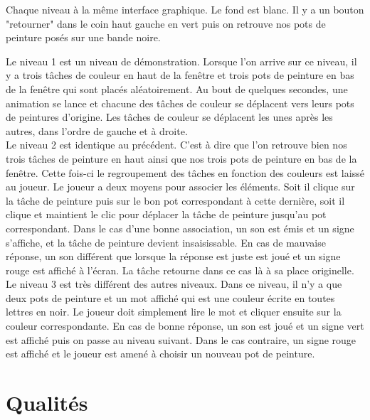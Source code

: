 \documentclass{article}
\begin{document}
Chaque niveau à la même interface graphique. Le fond est blanc. Il y a un bouton "retourner" dans le coin haut gauche en vert puis on retrouve nos pots de peinture posés sur une bande noire.

Le niveau 1 est un niveau de démonstration. Lorsque l'on arrive sur ce niveau, il y a trois tâches de couleur en haut de la fenêtre et trois pots de peinture en bas de la fenêtre qui sont placés aléatoirement. Au bout de quelques secondes, une animation se lance et chacune des tâches de couleur se déplacent vers leurs pots de peintures d'origine. Les tâches de couleur se déplacent les unes après les autres, dans l'ordre de gauche et à droite.\\

Le niveau 2 est identique au précédent. C'est à dire que l'on retrouve bien nos trois tâches de peinture en haut ainsi que nos trois pots de peinture en bas de la fenêtre. Cette fois-ci le regroupement des tâches en fonction des couleurs est laissé au joueur. Le joueur a deux moyens pour associer les éléments. Soit il clique sur la tâche de peinture puis sur le bon pot correspondant à cette dernière, soit il clique et maintient le clic pour déplacer la tâche de peinture jusqu'au pot correspondant. Dans le cas d'une bonne association, un son est émis et un signe s'affiche, et la tâche de peinture devient insaisissable. En cas de mauvaise réponse, un son différent que lorsque la réponse est juste est joué et un signe rouge est affiché à l'écran. La tâche retourne dans ce cas là à sa place originelle.\\

Le niveau 3 est très différent des autres niveaux. Dans ce niveau, il n'y a que deux pots de peinture et un mot affiché qui est une couleur écrite en toutes lettres en noir. Le joueur doit simplement lire le mot et cliquer ensuite sur la couleur correspondante. En cas de bonne réponse, un son est joué et un signe vert est affiché puis on passe au niveau suivant. Dans le cas contraire, un signe rouge est affiché et le joueur est amené à choisir un nouveau pot de peinture.


\section{Qualités}
\end{document}

